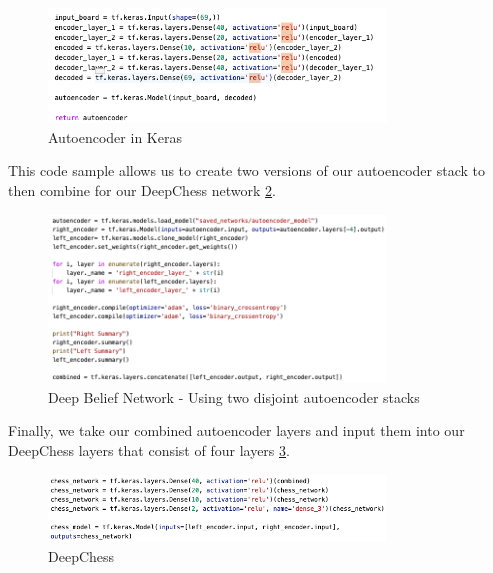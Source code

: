 \documentclass[12pt]{article}
\begin{document}
    \begin{singlespace}
        \begin{figure}[ht]
            \centering
            \caption{Autoencoder in Keras}
            \label{fig:autoencoder}
            \includegraphics[width=0.8\textwidth]{autoencoder.png}
        \end{figure}
    \end{singlespace}

    This code sample allows us to create two versions of our autoencoder stack to then combine for our DeepChess network \ref{fig:dbn}.
    \begin{singlespace}
        \begin{figure}[ht]
            \centering
            \caption{Deep Belief Network - Using two disjoint autoencoder stacks}
            \label{fig:dbn}
            \includegraphics[width=0.8\textwidth]{dbn.png}
        \end{figure}
    \end{singlespace}

    Finally, we take our combined autoencoder layers and input them into our DeepChess layers that consist of four layers \ref{fig:deepchess}.
    \begin{singlespace}
        \begin{figure}[ht]
            \centering
            \caption{DeepChess}
            \label{fig:deepchess}
            \includegraphics[width=0.8\textwidth]{deepchess.png}
        \end{figure}
    \end{singlespace}
\end{document}
